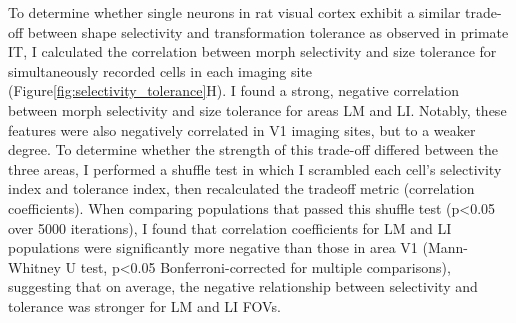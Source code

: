 To determine whether single neurons in rat visual cortex exhibit a similar trade-off between shape selectivity and transformation tolerance as observed in primate IT, I calculated the correlation between morph selectivity and size tolerance for simultaneously recorded cells in each imaging site (Figure\ref{fig:selectivity_tolerance}H). I found a strong, negative correlation between morph selectivity and size tolerance for areas LM and LI. Notably, these features were also negatively correlated in V1 imaging sites, but to a weaker degree. To determine whether the strength of this trade-off differed between the three areas, I performed a shuffle test in which I scrambled each cell’s selectivity index and tolerance index, then recalculated the tradeoff metric (correlation coefficients). When comparing populations that passed this shuffle test (p<0.05 over 5000 iterations), I found that correlation coefficients for LM and LI populations were significantly more negative than those in area V1 (Mann-Whitney U test, p<0.05 Bonferroni-corrected for multiple comparisons), suggesting that on average, the negative relationship between selectivity and tolerance was stronger for LM and LI FOVs.


